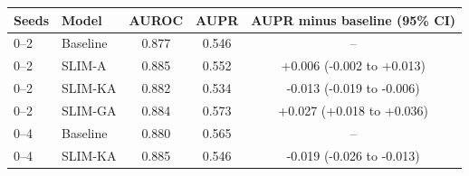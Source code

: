 \begin{tabular}{llccc}
\toprule
Seeds & Model & AUROC & AUPR & AUPR minus baseline (95\% CI) \\
\midrule
0--2 & Baseline & 0.877 & 0.546 & -- \\
0--2 & SLIM-A & 0.885 & 0.552 & +0.006 (-0.002 to +0.013) \\
0--2 & SLIM-KA & 0.882 & 0.534 & -0.013 (-0.019 to -0.006) \\
0--2 & SLIM-GA & 0.884 & 0.573 & +0.027 (+0.018 to +0.036) \\
\midrule
0--4 & Baseline & 0.880 & 0.565 & -- \\
0--4 & SLIM-KA & 0.885 & 0.546 & -0.019 (-0.026 to -0.013) \\
\bottomrule
\end{tabular}

